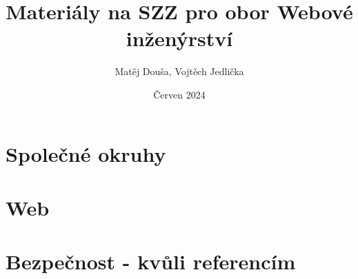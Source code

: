 \documentclass{article}
\title{Materiály na SZZ pro obor Webové inženýrství}
\author{Matěj Douša, Vojtěch Jedlička}
\date{Červen 2024}
\begin{document}
\maketitle

\tableofcontents

\newpage
\section{Společné okruhy}

\newpage

\newpage

\newpage

\newpage

\newpage

\newpage

\newpage

\newpage

\newpage

\newpage

\newpage

\newpage

\newpage

\newpage

\newpage

\newpage

\newpage

\newpage

\newpage

\newpage

\newpage

\newpage

\newpage

\newpage

\newpage

\newpage

\newpage

\newpage

\newpage

\newpage

\newpage
\section{Web}


\newpage
\section{Bezpečnost - kvůli referencím}

\newpage

\newpage

\newpage

\newpage

\newpage

\newpage

\newpage

\newpage

\newpage

\newpage

\newpage

\newpage

\newpage

\newpage

\newpage

\newpage

\newpage

\newpage

\newpage

\newpage

\newpage

\newpage

\newpage

\newpage

\newpage

\end{document}
